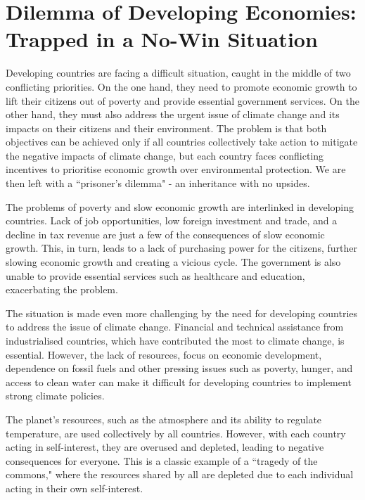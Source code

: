 \documentclass[11pt,a4paper]{article}
\begin{document}
\section*{Dilemma of Developing Economies: Trapped in a No-Win Situation}
Developing countries are facing a difficult situation, caught in the middle of two conflicting priorities. On the one hand, they need to promote economic growth to lift their citizens out of poverty and provide essential government services. On the other hand, they must also address the urgent issue of climate change and its impacts on their citizens and their environment. The problem is that both objectives can be achieved only if all countries collectively take action to mitigate the negative impacts of climate change, but each country faces conflicting incentives to prioritise economic growth over environmental protection. We are then left with a ``prisoner's dilemma"  - an inheritance with no upsides.  \par
The problems of poverty and slow economic growth are interlinked in developing countries. Lack of job opportunities, low foreign investment and trade, and a decline in tax revenue are just a few of the consequences of slow economic growth. This, in turn, leads to a lack of purchasing power for the citizens, further slowing economic growth and creating a vicious cycle. The government is also unable to provide essential services such as healthcare and education, exacerbating the problem. \par
The situation is made even more challenging by the need for developing countries to address the issue of climate change. Financial and technical assistance from industrialised countries, which have contributed the most to climate change, is essential. However, the lack of resources, focus on economic development, dependence on fossil fuels and other pressing issues such as poverty, hunger, and access to clean water can make it difficult for developing countries to implement strong climate policies. \par
The planet's resources, such as the atmosphere and its ability to regulate temperature, are used collectively by all countries. However, with each country acting in self-interest, they are overused and depleted, leading to negative consequences for everyone. This is a classic example of a ``tragedy of the commons," where the resources shared by all are depleted due to each individual acting in their own self-interest.
\end{document}
